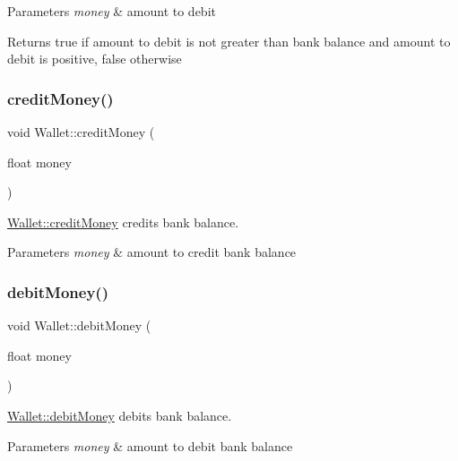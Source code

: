 \begin{DoxyParams}{Parameters}
{\em money} & amount to debit \\
\hline
\end{DoxyParams}
\begin{DoxyReturn}{Returns}
true if amount to debit is not greater than bank balance and amount to debit is positive, false otherwise 
\end{DoxyReturn}
\mbox{\label{classWallet_ab9354b0a8250c0f21b867cc725a33e1e}} 
\subsubsection{\texorpdfstring{creditMoney()}{creditMoney()}}
{\footnotesize\ttfamily void Wallet\+::credit\+Money (\begin{DoxyParamCaption}\item[{float}]{money }\end{DoxyParamCaption})}



\mbox{\hyperlink{classWallet_ab9354b0a8250c0f21b867cc725a33e1e}{Wallet\+::credit\+Money}} credits bank balance. 


\begin{DoxyParams}{Parameters}
{\em money} & amount to credit bank balance \\
\hline
\end{DoxyParams}
\mbox{\label{classWallet_a8be722d227a610e4b36b79c2eb04c73f}} 
\subsubsection{\texorpdfstring{debitMoney()}{debitMoney()}}
{\footnotesize\ttfamily void Wallet\+::debit\+Money (\begin{DoxyParamCaption}\item[{float}]{money }\end{DoxyParamCaption})}



\mbox{\hyperlink{classWallet_a8be722d227a610e4b36b79c2eb04c73f}{Wallet\+::debit\+Money}} debits bank balance. 


\begin{DoxyParams}{Parameters}
{\em money} & amount to debit bank balance \\
\hline
\end{DoxyParams}
\mbox{\label{classWallet_a92536035a1de76dc7842693beb93cd24}} 
